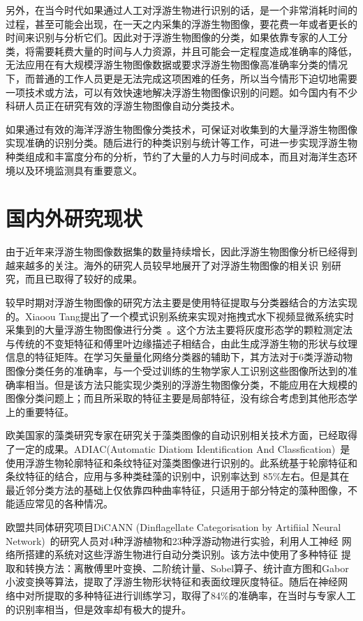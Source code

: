 另外，在当今时代如果通过人工对浮游生物进行识别的话，是一个非常消耗时间的过程，甚至可能会出现，在一天之内采集的浮游生物图像，要花费一年或者更长的时间来识别与分析它们。因此对于浮游生物图像的分类，如果依靠专家的人工分类，将需要耗费大量的时间与人力资源，并且可能会一定程度造成准确率的降低，无法应用在有大规模浮游生物图像数据或要求浮游生物图像高准确率分类的情况下，而普通的工作人员更是无法完成这项困难的任务，所以当今情形下迫切地需要一项技术或方法，可以有效快速地解决浮游生物图像识别的问题。如今国内有不少科研人员正在研究有效的浮游生物图像自动分类技术。

如果通过有效的海洋浮游生物图像分类技术，可保证对收集到的大量浮游生物图像实现准确的识别分类。随后进行的种类识别与统计等工作，可进一步实现浮游生物种类组成和丰富度分布的分析，节约了大量的人力与时间成本，而且对海洋生态环境以及环境监测具有重要意义。

\section{国内外研究现状}

由于近年来浮游生物图像数据集的数量持续增长，因此浮游生物图像分析已经得到越来越多的关注。海外的研究人员较早地展开了对浮游生物图像的相关识 别研究，而且已取得了较好的成果。

较早时期对浮游生物图像的研究方法主要是使用特征提取与分类器结合的方法实现的。Xiaoou Tang提出了一个模式识别系统来实现对拖拽式水下视频显微系统实时采集到的大量浮游生物图像进行分类~\cite{tang1998automatic}。这个方法主要将灰度形态学的颗粒测定法与传统的不变矩特征和傅里叶边缘描述子相结合，由此生成浮游生物的形状与纹理信息的特征矩阵。在学习矢量量化网络分类器的辅助下，其方法对于6类浮游动物图像分类任务的准确率，与一个受过训练的生物学家人工识别这些图像所达到的准确率相当。但是该方法只能实现少类别的浮游生物图像分类，不能应用在大规模的图像分类问题上；而且所采取的特征主要是局部特征，没有综合考虑到其他形态学上的重要特征。

欧美国家的藻类研究专家在研究关于藻类图像的自动识别相关技术方面，已经取得了一定的成果。ADIAC(Automatic Diatiom Identification And Classfication)~\cite{du2002automatic}是使用浮游生物轮廓特征和条纹特征对藻类图像进行识别的。此系统基于轮廓特征和条纹特征的结合，应用与多种类硅藻的识别中，识别率达到 85\%左右。但是其在最近邻分类方法的基础上仅依靠四种曲率特征，只适用于部分特定的藻种图像，不能适应常见的各种情况。

欧盟共同体研究项目DiCANN (Dinflagellate Categorisation by Artifiial Neural Network)~\cite{culverhouse2003experts}的研究人员对4种浮游植物和23种浮游动物进行实验，利用人工神经 网络所搭建的系统对这些浮游生物进行自动分类识别。该方法中使用了多种特征 提取和转换方法：离散傅里叶变换、二阶统计量、Sobel算子、统计直方图和Gabor 小波变换等算法，提取了浮游生物形状特征和表面纹理灰度特征。随后在神经网 络中对所提取的多种特征进行训练学习，取得了84\%的准确率，在当时与专家人工的识别率相当，但是效率却有极大的提升。

